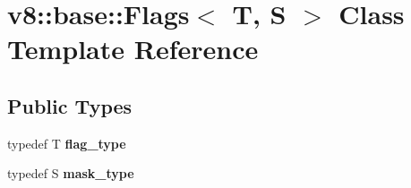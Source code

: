 \hypertarget{classv8_1_1base_1_1_flags}{}\section{v8\+:\+:base\+:\+:Flags$<$ T, S $>$ Class Template Reference}
\label{classv8_1_1base_1_1_flags}
\subsection*{Public Types}
\begin{DoxyCompactItemize}
\item 
typedef T {\bfseries flag\+\_\+type}\hypertarget{classv8_1_1base_1_1_flags_addb5d52df9e4f8d7d213a0532a65bfd0}{}\label{classv8_1_1base_1_1_flags_addb5d52df9e4f8d7d213a0532a65bfd0}

\item 
typedef S {\bfseries mask\+\_\+type}\hypertarget{classv8_1_1base_1_1_flags_aa53705f3746713ebecde6280deef2973}{}\label{classv8_1_1base_1_1_flags_aa53705f3746713ebecde6280deef2973}

\end{DoxyCompactItemize}
